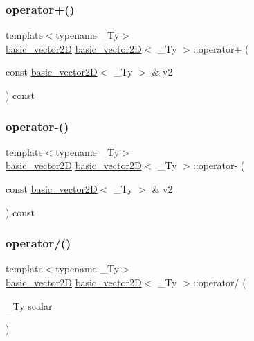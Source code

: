 \mbox{\label{structbasic__vector2_d_a0d01680904379f6984ee35cbe0ba3cf2}} 
\subsubsection{\texorpdfstring{operator+()}{operator+()}}
{\footnotesize\ttfamily template$<$typename \+\_\+\+Ty$>$ \\
\hyperlink{structbasic__vector2_d}{basic\+\_\+vector2D} \hyperlink{structbasic__vector2_d}{basic\+\_\+vector2D}$<$ \+\_\+\+Ty $>$\+::operator+ (\begin{DoxyParamCaption}\item[{const \hyperlink{structbasic__vector2_d}{basic\+\_\+vector2D}$<$ \+\_\+\+Ty $>$ \&}]{v2 }\end{DoxyParamCaption}) const\hspace{0.3cm}{\ttfamily [inline]}}

\mbox{\label{structbasic__vector2_d_a7d335c93ec37013c5d4804bd721a04ac}} 
\subsubsection{\texorpdfstring{operator-\/()}{operator-()}}
{\footnotesize\ttfamily template$<$typename \+\_\+\+Ty$>$ \\
\hyperlink{structbasic__vector2_d}{basic\+\_\+vector2D} \hyperlink{structbasic__vector2_d}{basic\+\_\+vector2D}$<$ \+\_\+\+Ty $>$\+::operator-\/ (\begin{DoxyParamCaption}\item[{const \hyperlink{structbasic__vector2_d}{basic\+\_\+vector2D}$<$ \+\_\+\+Ty $>$ \&}]{v2 }\end{DoxyParamCaption}) const\hspace{0.3cm}{\ttfamily [inline]}}

\mbox{\label{structbasic__vector2_d_a13a6172f8b5e7308964a372ed57a794b}} 
\subsubsection{\texorpdfstring{operator/()}{operator/()}}
{\footnotesize\ttfamily template$<$typename \+\_\+\+Ty$>$ \\
\hyperlink{structbasic__vector2_d}{basic\+\_\+vector2D} \hyperlink{structbasic__vector2_d}{basic\+\_\+vector2D}$<$ \+\_\+\+Ty $>$\+::operator/ (\begin{DoxyParamCaption}\item[{\+\_\+\+Ty}]{scalar }\end{DoxyParamCaption})\hspace{0.3cm}{\ttfamily [inline]}}

